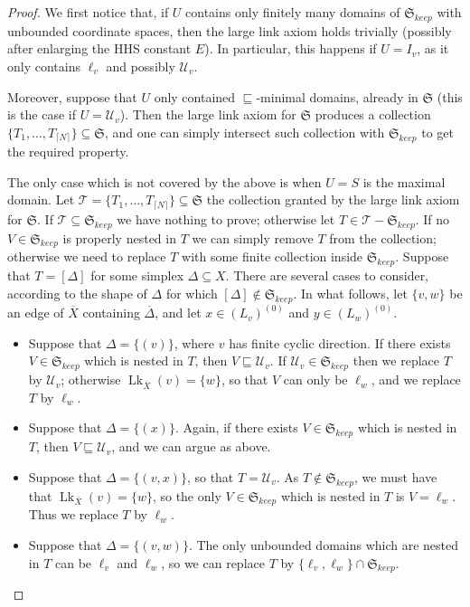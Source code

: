 \documentclass[svgnames]{amsart}
\theoremstyle{plain}
\theoremstyle{definition}
\newcommand{\frakS}{\mathfrak S}
\newcommand{\ov}[1]{\overline{#1}}
\newcommand{\U}{\mathcal{U}}
\newcommand{\nest}{\sqsubseteq}
\newcommand{\link}{\operatorname{Lk}}
\begin{document}
\begin{proof}
    We first notice that, if $U$ contains only finitely many domains of $\frakS_{keep}$ with unbounded coordinate spaces, then the large link axiom holds trivially (possibly after enlarging the HHS constant $E$). In particular, this happens if $U=I_v$, as it only contains $\ell_v$ and possibly $\U_v$.
\par\medskip

    Moreover, suppose that $U$ only contained $\nest$-minimal domains, already in $\frakS$ (this is the case if $U=\U_v$). Then the large link axiom for $\frakS$ produces a collection $\{T_1,\ldots, T_{\lceil N\rceil}\}\subseteq \frakS$, and one can simply intersect such collection with $\frakS_{keep}$ to get the required property.
\par\medskip

    The only case which is not covered by the above is when $U=S$ is the maximal domain. Let $\mathcal{T}=\{T_1,\ldots, T_{\lceil N\rceil}\}\subseteq \frakS$ the collection granted by the large link axiom for $\frakS$. If $\mathcal{T}\subseteq \frakS_{keep}$ we have nothing to prove; otherwise let $T\in \mathcal{T}-\frakS_{keep}$. If no $V\in\frakS_{keep}$ is properly nested in $T$ we can simply remove $T$ from the collection; otherwise we need to replace $T$ with some finite collection inside $\frakS_{keep}$. Suppose that $T=[\Delta]$ for some simplex $\Delta\subseteq X$. There are several cases to consider, according to the shape of $\Delta$ for which $[\Delta]\not\in \frakS_{keep}$. In what follows, let $\{v,w\}$ be an edge of $\ov X$ containing $\ov \Delta$, and let $x\in (L_v)^{(0)}$ and $y\in (L_w)^{(0)}$.
    \begin{itemize}
        \item Suppose that $\Delta=\{(v)\}$, where $v$ has finite cyclic direction. If there exists $V\in\frakS_{keep}$ which is nested in $T$, then $V\nest \U_v$. If $\U_v\in \frakS_{keep}$ then we replace $T$ by $\U_v$; otherwise $\link_{\ov X}(v)=\{w\}$, so that $V$ can only be $\ell_w$, and we replace $T$ by $\ell_w$. 
        \item Suppose that $\Delta=\{(x)\}$. Again, if there exists $V\in\frakS_{keep}$ which is nested in $T$, then $V\nest \U_v$, and we can argue as above.
        \item Suppose that $\Delta=\{(v,x)\}$, so that $T=\U_v$. As $T\not\in \frakS_{keep}$, we must have that $\link_{\ov X}(v)=\{w\}$, so the only $V\in\frakS_{keep}$ which is nested in $T$ is $V=\ell_w$. Thus we replace $T$ by $\ell_w$.
        \item Suppose that $\Delta=\{(v,w)\}$. The only unbounded domains which are nested in $T$ can be $\ell_v$ and $\ell_w$, so we can replace $T$ by $\{\ell_v, \ell_w\}\cap \frakS_{keep}$.

\end{itemize}
\end{proof}
\end{document}
